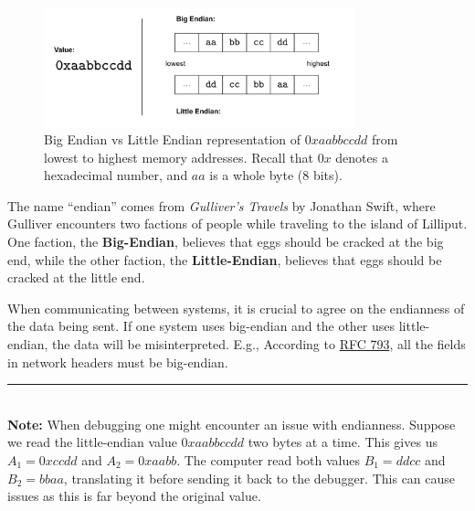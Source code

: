 \begin{figure}[ht!]
    \centering
    \includegraphics[width=0.8\textwidth]{sections/comp/big_endian.png}
    \caption{Big Endian vs Little Endian representation of $0xaabbccdd$ from lowest to highest memory addresses. Recall that $0x$ denotes a hexadecimal number,
    and $aa$ is a whole byte (8 bits).}
\end{figure}

\begin{Tip} The name ``endian'' comes from \emph{Gulliver's Travels} by Jonathan Swift, where
    Gulliver encounters two factions of people while traveling to the island of Lilliput. 
    One faction, the \textbf{Big-Endian}, believes that eggs should be cracked at the big end, 
    while the other faction, the \textbf{Little-Endian}, believes that eggs should be cracked at the little end.
\end{Tip}

    
\newpage

\begin{theo}

    \label{theo:communication_endianess}

    When communicating between systems, it is crucial to agree on the endianness of the data being sent. 
    If one system uses big-endian and the other uses little-endian, the data will be misinterpreted. 
    E.g., According to \href{https://datatracker.ietf.org/doc/html/rfc793}{RFC 793}, all the fields in network 
    headers must be big-endian.\\

    \noindent
    \rule{\textwidth}{0.4pt}\\
    \noindent
    \textbf{Note:} When debugging one might encounter an issue with endianness. Suppose we read the little-endian value
    $0xaabbccdd$ two bytes at a time. This gives us $A_1 = 0xccdd$ and $A_2 = 0xaabb$. The computer read both values 
    $B_1 = ddcc$ and $B_2 = bbaa$, translating it before sending it back to the debugger. This can cause issues as this is far beyond 
    the original value.
\end{theo}